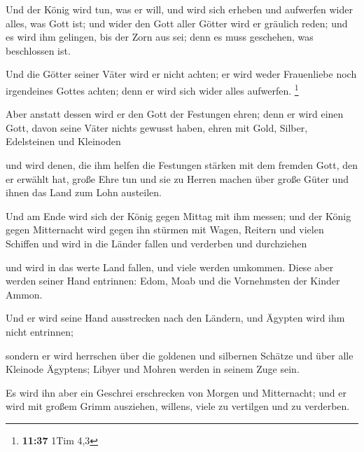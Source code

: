  Und der König wird tun, was er will, und wird sich
erheben und aufwerfen wider alles, was Gott ist; und wider den Gott
aller Götter wird er gräulich reden; und es wird ihm gelingen, bis der
Zorn aus sei; denn es muss geschehen, was beschlossen ist.

 Und die Götter seiner Väter wird er nicht achten; er
wird weder Frauenliebe noch irgendeines Gottes achten; denn er wird sich
wider alles aufwerfen. \footnote{\textbf{11:37} 1Tim 4,3}

 Aber anstatt dessen wird er den Gott der Festungen
ehren; denn er wird einen Gott, davon seine Väter nichts gewusst haben,
ehren mit Gold, Silber, Edelsteinen und Kleinoden

 und wird denen, die ihm helfen die Festungen stärken mit
dem fremden Gott, den er erwählt hat, große Ehre tun und sie zu Herren
machen über große Güter und ihnen das Land zum Lohn austeilen.

 Und am Ende wird sich der König gegen Mittag mit ihm
messen; und der König gegen Mitternacht wird gegen ihn stürmen mit
Wagen, Reitern und vielen Schiffen und wird in die Länder fallen und
verderben und durchziehen

 und wird in das werte Land fallen, und viele werden
umkommen. Diese aber werden seiner Hand entrinnen: Edom, Moab und die
Vornehmsten der Kinder Ammon.

 Und er wird seine Hand ausstrecken nach den Ländern, und
Ägypten wird ihm nicht entrinnen;

 sondern er wird herrschen über die goldenen und
silbernen Schätze und über alle Kleinode Ägyptens; Libyer und Mohren
werden in seinem Zuge sein.

 Es wird ihn aber ein Geschrei erschrecken von Morgen und
Mitternacht; und er wird mit großem Grimm ausziehen, willens, viele zu
vertilgen und zu verderben.

